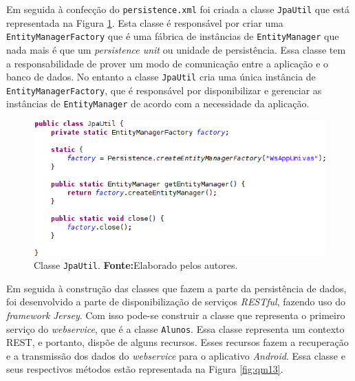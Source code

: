 			\par Em seguida à confecção do \texttt{persistence.xml} foi criada a
		classe \texttt{JpaUtil} que está representada na Figura \ref{fig:qm12}.
		Esta classe é responsável por criar uma \texttt{EntityManagerFactory} que é
		uma  fábrica de instâncias de \texttt{EntityManager} que nada mais é que um
		\textit{persistence unit} ou unidade de persistência. Essa classe tem a
		responsabilidade de prover um modo de comunicação entre a aplicação e o banco
		de dados. No entanto a classe \texttt{JpaUtil} cria uma única instância de
		\texttt{EntityManagerFactory}, que é responsável por disponibilizar e
		gerenciar as instâncias de \texttt{EntityManager} de acordo com a necessidade
		da aplicação.
		
		\pagebreak
		\begin{figure}[h!]
			\centerline{\includegraphics[scale=0.7]{./imagens/2_q_metodologico/qm12.png}}
			\caption[Classe \texttt{JpaUtil}]{Classe \texttt{JpaUtil}.
			\textbf{Fonte:}Elaborado pelos autores.}
			\label{fig:qm12}
		\end{figure}
		
	\par Em seguida à construção das classes que fazem a parte da persistência de
dados, foi desenvolvido a parte de disponibilização de serviços
\textit{RESTful}, fazendo uso do \textit{framework} \textit{Jersey}. Com isso
pode-se construir a classe que representa o primeiro serviço do
\textit{webservice}, que é a classe \texttt{Alunos}. Essa classe representa um
contexto REST, e portanto, dispõe de alguns recursos. Esses recursos fazem a
recuperação e a transmissão dos dados do \textit{webservice} para o aplicativo
\textit{Android}. Essa classe e seus respectivos métodos  estão representada na
Figura \ref{fig:qm13}.

